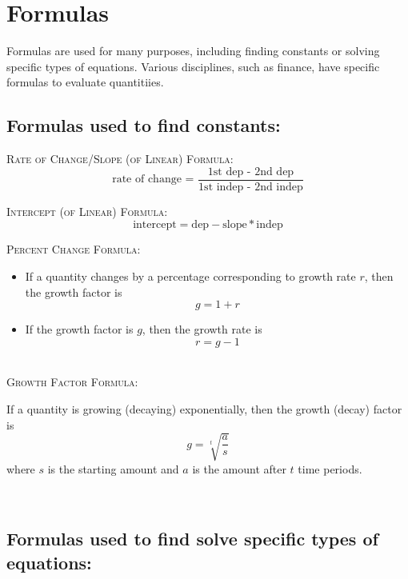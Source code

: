 
\section*{Formulas}  

Formulas are used for many purposes, including finding constants  or solving specific types of equations.  Various disciplines, such as finance, have specific formulas to evaluate quantitiies.

\vfill
\noindent \hrulefill
\bigskip
 
 \subsection*{Formulas used to find constants:} \bigskip
 
\noindent \textsc{Rate of Change/Slope (of Linear) Formula:} \quad $$ \displaystyle \text{rate of change = }\frac{\text{1st dep - 2nd dep}}{\text{1st indep - 2nd indep}}$$

\bigskip

\noindent \textsc{Intercept (of Linear) Formula:}$$\text{intercept} = \text{dep} -  \text{slope} \ast \text{indep}$$

\bigskip
 
 \noindent \textsc{Percent Change Formula:} 
\begin{itemize}
\item   If a quantity changes by a percentage corresponding to growth rate $r$, then the growth factor is $$\displaystyle g=1+r$$
\item If the growth factor is $g$, then the growth rate is $$r = g-1$$ ~
\end{itemize}
 
\noindent \textsc{Growth Factor Formula:} \bigskip

If a quantity is growing (decaying) exponentially, then the growth (decay) factor is 
$$\displaystyle g = \sqrt[t]{\frac{a}{s}}$$ 
\quad where $s$ is the starting amount and $a$ is the amount after $t$ time periods.

 \bigskip
\noindent \hrulefill
\vfill

\newpage

~\vfill

\noindent \hrulefill

\subsection*{Formulas used to find solve specific types of equations:} \bigskip


